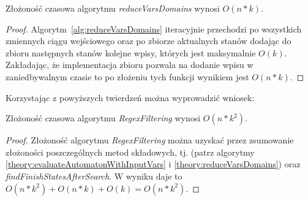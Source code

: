 \begin{theorem}
Złożoność czasowa algorytmu \textit{reduceVarsDomains} wynosi $O(n*k)$.
\label{theory:reduceVarsDomains}
\end{theorem}
\begin{proof}
Algorytm~\ref{alg:reduceVarsDomains} iteracyjnie przechodzi po wszystkich zmiennych ciągu wejściowego oraz po zbiorze
aktualnych stanów dodając do zbioru następnych stanów kolejne wpisy, których jest maksymalnie $O(k)$. Zakładając, że
implementacja zbioru pozwala na dodanie wpisu w zaniedbywalnym czasie to po złożeniu tych funkcji wynikiem jest $O(n*k)$.
\end{proof}
\par
Korzystając z powyższych twierdzeń można wyprowadzić wniosek:
\begin{theorem}
Złożoność czasowa algorytmu \textit{RegexFiltering} wynosi $O(n*k^2)$.
\label{theorem:RegexFiltering}
\end{theorem}
\begin{proof}
Złożoność algorytmu \textit{RegexFiltering} można uzyskać przez zsumowanie złożoności poszczególnych metod składowych, tj.
(patrz algorytmy \ref{theory:evaluateAutomatonWithInputVars} i \ref{theory:reduceVarsDomains}) oraz \textit{findFinishStatesAfterSearch}.
W wyniku daje to $O(n*k^2) + O(n*k) + O(k) = O(n*k^2)$.
\end{proof}
